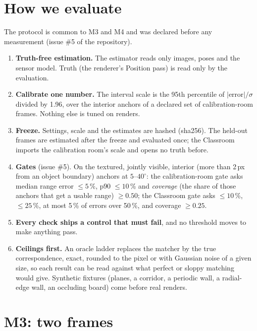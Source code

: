 \documentclass[11pt,a4paper]{article}
\begin{document}
\section{How we evaluate}\label{sec:protocol}

The protocol is common to M3 and M4 and was declared before any measurement (issue \#5 of the repository).
\begin{enumerate}
\item \textbf{Truth-free estimation.} The estimator reads only images, poses and the sensor model. Truth (the renderer's
  Position pass) is read only by the evaluation.
\item \textbf{Calibrate one number.} The interval scale is the 95th percentile of $|\text{error}|/\sigma$ divided by
  1.96, over the interior anchors of a declared set of calibration-room frames. Nothing else is tuned on renders.
\item \textbf{Freeze.} Settings, scale and the estimates are hashed (sha256). The held-out frames are estimated after
  the freeze and evaluated once; the Classroom imports the calibration room's scale and opens no truth before.
\item \textbf{Gates} (issue \#5). On the textured, jointly visible, interior (more than 2\,px from an object boundary)
  anchors at $5$--$40^\circ$: the calibration-room gate asks median range error $\le5$\,\%, p90 $\le10$\,\% and
  \emph{coverage} (the share of those anchors that get a usable range) $\ge0.50$; the Classroom gate asks $\le10$\,\%,
  $\le25$\,\%, at most 5\,\% of errors over 50\,\%, and coverage $\ge0.25$.
\item \textbf{Every check ships a control that must fail}, and no threshold moves to make anything pass.
\item \textbf{Ceilings first.} An oracle ladder replaces the matcher by the true correspondence, exact, rounded to the
  pixel or with Gaussian noise of a given size, so each result can be read against what perfect or sloppy matching
  would give. Synthetic fixtures (planes, a corridor, a periodic wall, a radial-edge wall, an occluding board) come
  before real renders.
\end{enumerate}

\section{M3: two frames}\label{sec:m3}
\end{document}
